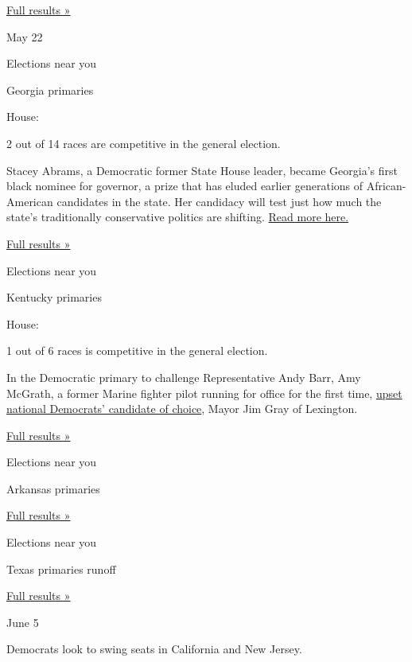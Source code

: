 \href{https://www.nytimes3xbfgragh.onion/interactive/2018/05/15/us/elections/results-pennsylvania-primary-elections.html}{Full
results »}

May 22

Elections near you

Georgia primaries

House:

2 out of 14 races are competitive in the general election.

Stacey Abrams, a Democratic former State House leader, became Georgia's
first black nominee for governor, a prize that has eluded earlier
generations of African-American candidates in the state. Her candidacy
will test just how much the state's traditionally conservative politics
are shifting.
\href{https://www.nytimes3xbfgragh.onion/2018/05/22/us/politics/georgia-primary-abrams-results.html}{Read
more here.}

\href{https://www.nytimes3xbfgragh.onion/interactive/2018/05/22/us/elections/results-georgia-primary-elections.html}{Full
results »}

Elections near you

Kentucky primaries

House:

1 out of 6 races is competitive in the general election.

In the Democratic primary to challenge Representative Andy Barr, Amy
McGrath, a former Marine fighter pilot running for office for the first
time,
\href{https://www.nytimes3xbfgragh.onion/2018/05/22/us/politics/kentucky-election-mcgrath.html}{upset
national Democrats' candidate of choice}, Mayor Jim Gray of Lexington.

\href{https://www.nytimes3xbfgragh.onion/interactive/2018/05/22/us/elections/results-kentucky-primary-elections.html}{Full
results »}

Elections near you

Arkansas primaries

\href{https://www.nytimes3xbfgragh.onion/interactive/2018/05/22/us/elections/results-arkansas-primary-elections.html}{Full
results »}

Elections near you

Texas primaries runoff

\href{https://www.nytimes3xbfgragh.onion/interactive/2018/05/22/us/elections/results-texas-primary-runoff-elections.html}{Full
results »}

June 5

Democrats look to swing seats in California and New Jersey.

